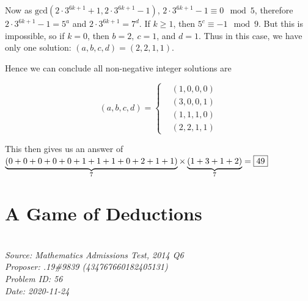 \documentclass[titlepage=true]{scrartcl}
\begin{document}
\begin{solution}
         Now as \(\mathrm{gcd}(2\cdot3^{6k+1}+1,2\cdot3^{6k+1}-1)\), \(2\cdot3^{6k+1}-1\equiv0\mod{5}\), therefore \(2\cdot3^{6k+1}-1=5^a\) and \(2\cdot3^{6k+1}=7^d\). 
         If \(k\geq1\), then \(5^c\equiv-1\mod{9}\). 
         But this is impossible, so if \(k=0\), then \(b=2,\ c=1\), and \(d=1\).  
         Thus in this case, we have only one solution: \((a,b,c,d)=(2,2,1,1)\).

         Hence we can conclude all non-negative integer solutions are

         \begin{equation*}
            (a,b,c,d)=\begin{cases}
                 &(1,0,0,0)\\
                 &(3,0,0,1)\\
                 &(1,1,1,0)\\
                 &(2,2,1,1)
             \end{cases}
         \end{equation*}
        
        This then gives us an answer of \(\underbrace{(0+0+0+0+0+1+1+1+0+2+1+1)}_{7}\times\underbrace{(1+3+1+2)}_{7}=\fbox{49}\) 
     \end{solution}


\section{A Game of Deductions}

    \SSbreak\\   
    \emph{Source: Mathematics Admissions Test, 2014 Q6}\\
    \emph{Proposer: .19\#9839 (434767660182405131)}\\
    \emph{Problem ID: 56}\\
    \emph{Date: 2020-11-24}\\
    \SSbreak
\end{document}
